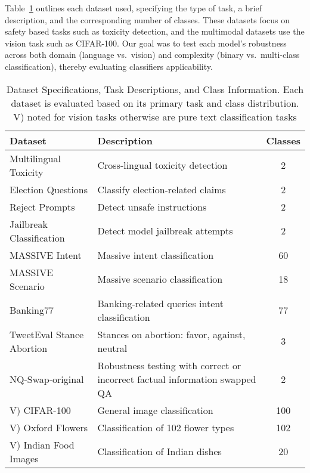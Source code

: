 Table~\ref{tab:dataset_specs} outlines each dataset used, specifying the type of task, a brief description, and the corresponding number of classes. 
These datasets focus on safety based tasks such as toxicity detection, and the multimodal datasets use the vision task such as CIFAR-100. 
Our goal was to test each model’s robustness across both domain (language vs.\ vision) and complexity (binary vs.\ multi-class classification), thereby evaluating classifiers applicability.

\begin{table}[ht]
    \centering
    \caption{Dataset Specifications, Task Descriptions, and Class Information. Each dataset is evaluated based on its primary task and class distribution. V) noted for vision tasks otherwise are pure text classification tasks}
    \label{tab:dataset_specs}
    \begin{tabular}{lp{5cm}c}
        \toprule
        \textbf{Dataset} & \textbf{Description} & \textbf{Classes} \\
        \midrule
        Multilingual Toxicity \cite{dementieva2024overview} 
            & Cross-lingual toxicity detection & 2 \\
        Election Questions \cite{anthropic_election_questions} 
            & Classify election-related claims  & 2 \\
        Reject Prompts \cite{arditi2024refusal} 
            & Detect unsafe instructions & 2 \\
        Jailbreak Classification \cite{jackhhao_jailbreak_classification} 
            & Detect model jailbreak attempts & 2 \\
        MASSIVE Intent \cite{fitzgerald2023massive} 
            & Massive intent classification & 60 \\
        MASSIVE Scenario \cite{fitzgerald2023massive} 
            & Massive scenario classification & 18 \\
        Banking77 \cite{Casanueva2020} 
            & Banking-related queries intent classification & 77 \\
        TweetEval Stance Abortion \cite{setfit_tweet_eval_stance_abortion} 
            & Stances on abortion: favor, against, neutral  & 3 \\
        NQ-Swap-original \cite{longpre2022entitybasedknowledgeconflictsquestion} 
            & Robustness testing with correct or incorrect factual information swapped QA & 2 \\
        V) CIFAR-100 \cite{krizhevsky2009learning} 
            & General image classification & 100 \\
        V) Oxford Flowers \cite{nelorth_oxford_flowers} 
            & Classification of 102 flower types & 102 \\
        V) Indian Food Images \cite{rajistics_indian_food_images} 
            & Classification of Indian dishes & 20 \\
        \bottomrule
    \end{tabular}
\end{table}

